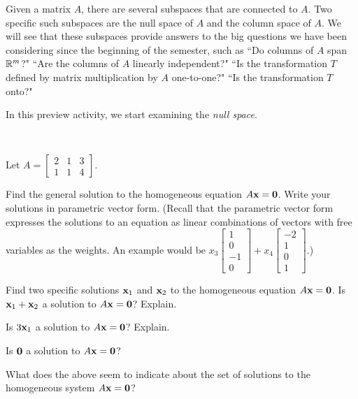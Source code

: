 Given a matrix $A$, there are several subspaces that are connected to $A$. Two specific such subspaces are the null space of $A$ and the column space of $A$. We will see that these subspaces provide answers to the big questions we have been considering since the beginning of the semester, such as ``Do columns of $A$ span $\mathbb{R}^m$?" ``Are the columns of $A$ linearly independent?" ``Is the transformation $T$ defined by matrix multiplication by $A$ one-to-one?" ``Is the transformation $T$ onto?" 

In this preview activity, we start examining the \emph{null space}. 


\begin{pa} \label{pa:3_b} ~
\be
\item Let $A =  \left[ \begin {array}{ccc} 2&1&3\\ 1&1&4 \end {array} \right]$.
	\ba
	\item Find the general solution to the homogeneous equation $A \mathbf{x} = \mathbf{0}$. Write your solutions in parametric vector form. (Recall that the parametric vector form expresses the solutions to an equation as linear combinations of vectors with free variables as the weights. An example would be $x_3 \left[ \begin{array}{r} 1\\0\\-1\\0\end{array}\right] + x_4 \left[ \begin{array}{r} -2\\1\\0\\1\end{array} \right]$.)



	\item Find two specific solutions $\mathbf{x}_1$ and $\mathbf{x}_2$ to the homogeneous equation $A \mathbf{x} = \mathbf{0}$. Is $\mathbf{x}_1 + \mathbf{x}_2$ a solution to $A \mathbf{x} = \mathbf{0}$? Explain.



	\item Is $3\mathbf{x}_1$ a solution to $A \mathbf{x} = \mathbf{0}$? Explain. 



	\item Is $\mathbf{0}$ a solution to $A \mathbf{x} = \mathbf{0}$? 
	
	
	
	\item What does the above seem to indicate about the set of solutions to the homogeneous system $A \mathbf{x} = \mathbf{0}$? 




\end{pa}
